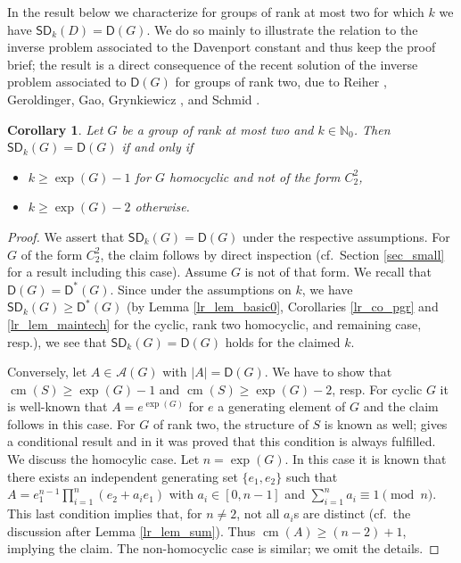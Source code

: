 \documentclass{amsart}
\newtheorem{co}[thm]{Corollary}
\theoremstyle{definition}
\numberwithin{equation}{section}
\begin{document}
In the result below we characterize for groups of rank at most two for which $k$ we have ${\mathsf{SD}}_k(D)={\mathsf{D}}(G)$. We do so mainly to illustrate the relation to the inverse problem associated to the Davenport constant and thus keep the proof brief; the result is a direct consequence of the recent solution of the inverse problem associated to ${\mathsf{D}}(G)$ for groups of rank two,
due to Reiher \cite{reiher}, Geroldinger, Gao, Grynkiewicz \cite{GGG}, and Schmid \cite{schmid}.

\begin{co}
\label{lr_co_2r}
Let $G$ be a group of rank at most two and $k \in \mathbb{N}_0$.
Then ${\mathsf{SD}}_k(G)= {\mathsf{D}}(G)$ if and only if
\begin{itemize}
\item $k\ge \exp(G)-1$ for $G$ homocyclic and not of the form $C_2^2$,
\item $k\ge \exp(G)-2$ otherwise.
\end{itemize}
\end{co}
\begin{proof}
We assert that ${\mathsf{SD}}_k(G)= {\mathsf{D}}(G)$ under the respective assumptions.
For $G$ of the form $C_2^2$, the claim follows by direct inspection (cf.~Section \ref{sec_small} for a result including this case). Assume $G$ is not of that form.
We recall that ${\mathsf{D}}(G)={\mathsf{D}^{\ast}}(G)$.
Since under the assumptions on $k$, we have ${\mathsf{SD}}_k(G)\ge {\mathsf{D}^{\ast}}(G)$ (by Lemma \ref{lr_lem_basic0}, Corollaries \ref{lr_co_pgr} and \ref{lr_lem_maintech} for the cyclic, rank two homocyclic, and remaining case, resp.),
we see that ${\mathsf{SD}}_k(G)= {\mathsf{D}}(G)$ holds for the claimed $k$.

Conversely, let $A \in {{}^{{}}\!\mathcal{A}} (G)$ with $|A|={\mathsf{D}}(G)$. We have to show that
$\operatorname{cm}(S)\ge \exp(G)-1$ and $\operatorname{cm}(S)\ge \exp(G)-2$, resp.
For cyclic $G$ it is well-known that $A=e^{\exp(G)}$ for $e$ a generating element of $G$ and the claim follows in this case. For $G$ of rank two, the structure of $S$ is known as well; \cite[Corollary]{GGG} gives a conditional result and in \cite{reiher} it was proved that this condition is always fulfilled.
We discuss the homocylic case.
Let $n=\exp(G)$.
In this case it is known that there exists an independent generating set $\{e_1,e_2\}$ such that $A=e_1^{n-1}\prod_{i=1}^n(e_2+a_ie_1)$
with $a_i\in [0,n-1]$ and $\sum_{i=1}^n a_i \equiv 1 \pmod{n}$.
This last condition implies that, for $n\neq 2$, not all $a_i$s are distinct (cf.~the discussion after Lemma \ref{lr_lem_sum}).
Thus $\operatorname{cm}(A)\ge (n-2)+1$, implying the claim.
The non-homocyclic case is similar; we omit the details.
\end{proof}
\end{document}
